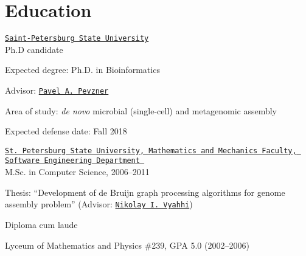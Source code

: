 \section{Education}
%
%
\href{http://english.spbu.ru/}{\tt Saint-Petersburg State University}\\
  Ph.D candidate
\begin{innerlist}
  \item Expected degree: Ph.D. in Bioinformatics
  \item Advisor: \href{http://cseweb.ucsd.edu/~ppevzner/}{\tt Pavel A.~Pevzner}
  \item Area of study: \textit{de novo} microbial (single-cell) and metagenomic assembly
  \item Expected defense date: Fall 2018
\end{innerlist}

\blankline

\href{http://www.math.spbu.ru/en/index.html}{\tt St.~Petersburg State University, Mathematics and Mechanics Faculty, Software Engineering Department 
}\\
  M.Sc. in Computer Science, 2006--2011 %
\begin{innerlist}
  \item Thesis: ``Development of de Bruijn graph processing algorithms
        for genome assembly problem'' (Advisor: \href{http://spbsu.ru/vyahhi/}{\tt Nikolay I.~Vyahhi})
  \item Diploma cum laude
\end{innerlist}

\blankline

Lyceum of Mathematics and Physics \#239, GPA 5.0 (2002--2006)

